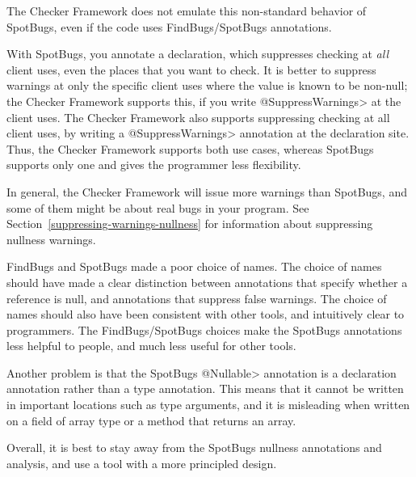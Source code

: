 \noindent
The Checker Framework does not emulate this non-standard behavior of
SpotBugs, even if the code uses FindBugs/SpotBugs annotations.

With SpotBugs, you annotate a declaration, which suppresses checking at
\emph{all} client uses, even the places that you want to check.
It is better to suppress warnings at only the specific client uses
where the value is known to be non-null; the Checker Framework supports
this, if you write \<@SuppressWarnings> at the client uses.
The Checker Framework also supports suppressing checking at all client uses,
by writing a \<@SuppressWarnings> annotation at the declaration site.
Thus, the Checker Framework supports both use cases, whereas SpotBugs
supports only one and gives the programmer less flexibility.

In general, the Checker Framework will issue more warnings than SpotBugs,
and some of them might be about real bugs in your program.
See Section~\ref{suppressing-warnings-nullness} for information about
suppressing nullness warnings.

FindBugs and SpotBugs made a poor choice of names.  The choice of names should have made a
clear distinction between annotations that specify whether a reference is
null, and annotations that suppress false warnings.  The choice of names
should also have been consistent with other tools, and intuitively clear to
programmers.  The FindBugs/SpotBugs choices make the SpotBugs annotations less
helpful to people, and much less useful for other tools.

Another problem is that the SpotBugs \<@Nullable> annotation is a
declaration annotation rather than a type annotation.  This means that it
cannot be written in important locations such as type arguments, and it is
misleading when written on a field of array type or a method that returns
an array.

Overall, it is best to stay away from the SpotBugs nullness annotations and
analysis, and use a tool with a more principled design.


